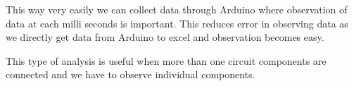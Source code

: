 \documentclass[12pt]{article}
\begin{document}
{\fontsize{14pt}{16.8pt}\selectfont  This way very easily we can collect data through Arduino where observation of data at each milli seconds is important. This reduces error in observing data as we directly get data from Arduino to excel and observation becomes easy.\par}\par

\vspace{\baselineskip}
{\fontsize{14pt}{16.8pt}\selectfont This type of analysis is useful when more than one circuit components are connected and we have to observe individual components. \par}\par

\vspace{\baselineskip}
{\fontsize{14pt}{16.8pt}\selectfont \ \  \par}\par
\end{document}
